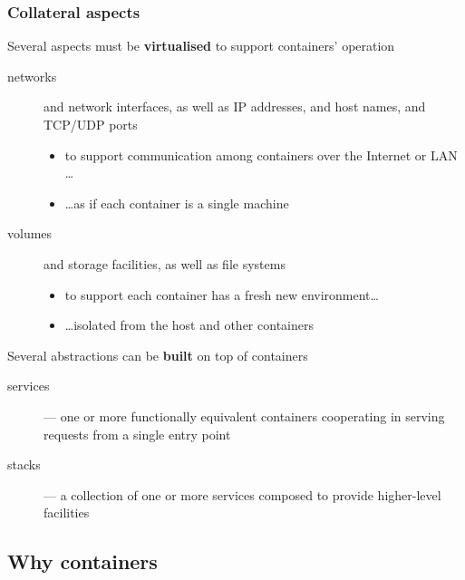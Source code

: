 \documentclass[presentation]{beamer}\mode<presentation>{\usetheme{AMSBolognaFC}}
\begin{document}
\begin{frame}[allowframebreaks]
    \frametitle{Collateral aspects}

    \begin{block}{Several aspects must be \textbf{virtualised} to support containers' operation}
        \begin{description}
            \item[networks] and \alert{network interfaces}, as well as IP addresses, and host names, and TCP/UDP ports
            \begin{itemize}\small
                \item to support communication among containers over the Internet or LAN \dots
                \item \ldots as if each container is a single machine
            \end{itemize}

            \item[volumes] and \alert{storage facilities}, as well as file systems
            \begin{itemize}\small
                \item to support each container has a fresh new environment\ldots
                \item \ldots isolated from the host and other containers
            \end{itemize}
        \end{description}
    \end{block}

    \begin{block}{Several abstractions can be \textbf{built} on top of containers}
        \begin{description}
            \item[services] --- one or more functionally equivalent containers cooperating in serving requests from a single entry point

            \item[stacks] --- a collection of one or more services composed to provide higher-level facilities
        \end{description}
    \end{block}

\end{frame}

\subsection{Why containers}
\end{document}
